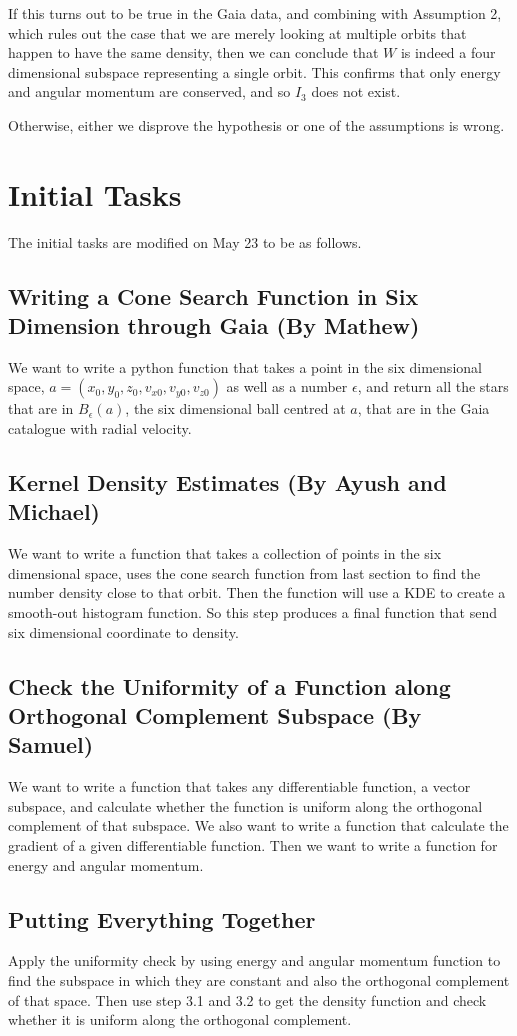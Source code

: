 \documentclass[12pt]{article}
\begin{document}
If this turns out to be true in the Gaia data, and combining with Assumption 2, which rules out the case that we are merely looking at multiple orbits that happen to have the same density, then we can conclude that $W$ is indeed a four dimensional subspace representing a single orbit. This confirms that only energy and angular momentum are conserved, and so $I_3$ does not exist. 

Otherwise, either we disprove the hypothesis or one of the assumptions is wrong.

\section{Initial Tasks}
The initial tasks are modified on May 23 to be as follows.
\subsection{Writing a Cone Search Function in Six Dimension through Gaia (By Mathew)}
We want to write a python function that takes a point in the six dimensional space, $ a = (x_0, y_0, z_0, v_{x0}, v_{y0}, v_{z0})$ as well as a number $\epsilon$, and return all the stars that are in $B_\epsilon(a)$, the six dimensional ball centred at $a$, that are in the Gaia catalogue with radial velocity.
\subsection{Kernel Density Estimates (By Ayush and Michael)}
We want to write a function that takes a collection of points in the six dimensional space, uses the cone search function from last section to find the number density close to that orbit. Then the function will use a KDE to create a smooth-out histogram function. So this step produces a final function that send six dimensional coordinate to density.
\subsection{Check the Uniformity of a Function along Orthogonal Complement Subspace (By Samuel)}
We want to write a function that takes any differentiable function, a vector subspace, and calculate whether the function is uniform along the orthogonal complement of that subspace. We also want to write a function that calculate the gradient of a given differentiable function. Then we want to write a function for energy and angular momentum. 
\subsection{Putting Everything Together}
Apply the uniformity check by using energy and angular momentum function to find the subspace in which they are constant and also the orthogonal complement of that space. Then use step 3.1 and 3.2 to get the density function and check whether it is uniform along the orthogonal complement.
 
\end{document}
